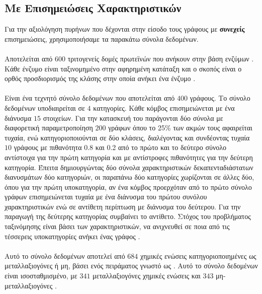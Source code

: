 \subsection{Με Επισημειώσεις Χαρακτηριστικών}
\label{ssec:atr}
Για την αξιολόγηση πυρήνων που δέχονται στην είσοδο τους γράφους με \textbf{συνεχείς} επισημειώσεις, χρησιμοποιήσαμε τα παρακάτω σύνολα δεδομένων.

\paragraph*{} Αποτελείται από $600$ τριτογενείς δομές πρωτεϊνών που ανήκουν στην βάση ενζύμων .
Κάθε ένζυμο είναι ταξινομημένο στην αφηρημένη κατάταξη  και ο σκοπός είναι ο ορθός προσδιορισμός της κλάσης στην οποία ανήκει ένα ένζυμο \cite{Borgwardt2005}.

\paragraph*{} Είναι ένα τεχνητό σύνολο δεδομένων που αποτελείται από $400$ γράφους.
Το σύνολο δεδομένων υποδιαιρείται σε $4$ κατηγορίες.
Κάθε κόμβος επισημειώνεται με ένα διάνυσμα $15$ στοιχείων.
Για την κατασκευή του παράγονται δύο σύνολα με διαφορετική παραμετροποίηση $200$ γράφων  όπου το 25\% των ακμών τους αφαιρείται τυχαία, ενώ κατηγοριοποιούνται σε δύο κλάσεις, διαλέγοντας και συνδέοντας τυχαία $10$ γράφους με πιθανότητα 0.8 και 0.2 από το πρώτο και το δεύτερο σύνολο αντίστοιχα για την πρώτη κατηγορία και με αντίστροφες πιθανότητες για την δεύτερη κατηγορία.
Έπειτα δημιουργώντας δύο σύνολα χαρακτηριστικών δεκαπενταδιάστατων διανυσμάτων δύο κατηγοριών, οι παραπάνω δύο κατηγορίες χωρίζονται σε άλλες δύο, όπου για την πρώτη υποκατηγορία, αν ένα κόμβος προερχόταν από το πρώτο σύνολο γράφων επισημειώνεται τυχαία με ένα διάνυσμα του πρώτου συνόλου χαρακτηριστικών ενώ σε αντίθετη περίπτωση με διάνυσμα του δεύτερου.
Για την παραγωγή της δεύτερης κατηγορίας συμβαίνει το αντίθετο.
Στόχος του προβλήματος ταξινόμησης είναι βάσει των χαρακτηριστικών, να ανιχνευθεί σε ποια από τις τέσσερεις υποκατηγορίες ανήκει ένας γράφος \cite{Morris16}.

\paragraph*{} Αυτό το σύνολο δεδομένων αποτελεί από $684$ χημικές ενώσεις κατηγοριοποιημένες ως μεταλλαξιογόνες ή μη, βάσει ενός πειράματος γνωστό ως .
Αυτό το σύνολο δεδομένων είναι ισοσταθμισμένο, με $341$ μεταλλαξιογόνες χημικές ενώσεις και $343$ μη-μεταλλαξιογόνες \cite{mahe2009graph, Neumann2016}.

